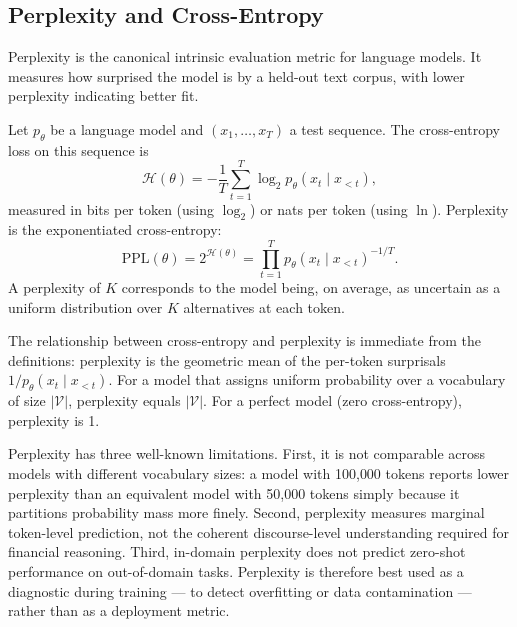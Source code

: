 \begin{deepdive}

\subsection{Perplexity and Cross-Entropy}
\label{subsec:perplexity}

Perplexity is the canonical intrinsic evaluation metric for language models.
It measures how surprised the model is by a held-out text corpus, with lower
perplexity indicating better fit.

\begin{definition}[Perplexity]
\label{def:perplexity}
Let $p_\theta$ be a language model and $(x_1, \ldots, x_T)$ a test sequence.
The cross-entropy loss on this sequence is
\begin{equation}
  \mathcal{H}(\theta) = -\frac{1}{T} \sum_{t=1}^{T} \log_2 p_\theta(x_t \mid x_{<t}),
  \label{eq:cross-entropy}
\end{equation}
measured in bits per token (using $\log_2$) or nats per token (using $\ln$).
Perplexity is the exponentiated cross-entropy:
\begin{equation}
  \mathrm{PPL}(\theta) = 2^{\mathcal{H}(\theta)}
                       = \prod_{t=1}^{T} p_\theta(x_t \mid x_{<t})^{-1/T}.
  \label{eq:perplexity}
\end{equation}
A perplexity of $K$ corresponds to the model being, on average, as uncertain
as a uniform distribution over $K$ alternatives at each token.
\end{definition}

The relationship between cross-entropy and perplexity is immediate from the
definitions: perplexity is the geometric mean of the per-token surprisals
$1/p_\theta(x_t \mid x_{<t})$.  For a model that assigns uniform probability
over a vocabulary of size $|\mathcal{V}|$, perplexity equals $|\mathcal{V}|$.
For a perfect model (zero cross-entropy), perplexity is 1.

Perplexity has three well-known limitations.  First, it is not comparable
across models with different vocabulary sizes: a model with 100{,}000 tokens
reports lower perplexity than an equivalent model with 50{,}000 tokens simply
because it partitions probability mass more finely.  Second, perplexity
measures marginal token-level prediction, not the coherent discourse-level
understanding required for financial reasoning.  Third, in-domain perplexity
does not predict zero-shot performance on out-of-domain tasks.  Perplexity is
therefore best used as a diagnostic during training --- to detect overfitting or
data contamination --- rather than as a deployment metric.


\end{deepdive}
